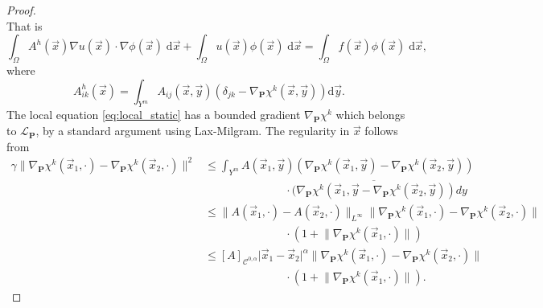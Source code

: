 \documentclass[a4paper,reqno]{amsart}
\numberwithin{equation}{section}
\numberwithin{equation}{section}		%
\numberwithin{figure}{section}			%
\numberwithin{table}{section}				%
\theoremstyle{definition}
\newcommand{\<}{\ensuremath \leq}
\renewcommand{\>}{\ensuremath \geq}
\begin{document}
\begin{proof}
\begin{equation*}
\end{equation*}
That is
 \begin{equation*}  \label{eq:homogenized_static}
    \int_\Omega  A^h(\vec{x})  \nabla  u(\vec{x})  \cdot \nabla \phi(\vec{x}) \; \mathrm{d}\vec{x}
    +\int_\Omega   u (\vec{x})  \phi(\vec{x}) \; \mathrm{d}\vec{x}
    =   \int_\Omega   f (\vec{x})  \phi(\vec{x}) \; \mathrm{d}\vec{x},
\end{equation*}
where
\begin{equation*}
          A^h_{ik}(\vec{x}) =   \int_{Y^m} A_{ij}\left(\vec{x},\vec{y} \right) \left( \delta_{jk} -  \nabla_{\textbf{P}}\chi^k (\vec{x}, \vec{y})\right) \mathrm{d}\vec{y}.
\end{equation*}
The local equation \eqref{eq:local_static} has a bounded gradient $\nabla_\textbf{P}\chi^k $ which belongs to ${\mathcal L}_\textbf{P}$, by a standard argument using Lax-Milgram. The regularity in $\vec{x}$ follows from
\begin{equation*}
    \begin{aligned}
        \gamma\lVert \nabla_{\textbf{P}}\chi^k(\vec{x}_1,\cdot) - \nabla_{\textbf{P}}\chi^k(\vec{x}_2,\cdot)\rVert^2 &\leq \int_{Y^m}A(\vec{x}_1,\vec{y}) (\nabla_{\textbf{P}}\chi^k(\vec{x}_1,\vec{y}) - \nabla_{\textbf{P}}\chi^k(\vec{x}_2,\vec{y}))\\
        &\hspace{3cm}\cdot \overline{(\nabla_{\textbf{P}}\chi^k(\vec{x}_1,\vec{y} - \nabla_{\textbf{P}}\chi^k(\vec{x}_2,\vec{y}))}dy\\
        &\leq\lVert A(\vec{x}_1,\cdot)-A(\vec{x}_2,\cdot)\rVert_{L^\infty}\lVert \nabla_{\textbf{P}}\chi^k(\vec{x}_1,\cdot) - \nabla_{\textbf{P}}\chi^k(\vec{x}_2,\cdot)\rVert\\
        &\hspace{3cm}\cdot(1 + \lVert \nabla_{\textbf{P}}\chi^k(\vec{x}_1,\cdot)\rVert)\\
        &\leq [A]_{\mathcal{C}^{0,\alpha}} \lvert\vec{x}_1-\vec{x}_2\rvert^\alpha\lVert \nabla_{\textbf{P}}\chi^k(\vec{x}_1,\cdot) - \nabla_{\textbf{P}}\chi^k(\vec{x}_2,\cdot)\rVert\\
        &\hspace{3cm}\cdot (1 + \lVert \nabla_{\textbf{P}}\chi^k(\vec{x}_1,\cdot)\rVert).
    \end{aligned}
\end{equation*}
\end{proof}
\end{document}
